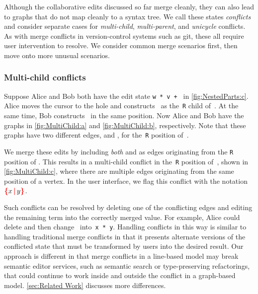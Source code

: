 Although the collaborative edits discussed so far merge cleanly,
they can also lead to graphs that do not map cleanly to a syntax tree.
We call these states \emph{conflicts}
and consider separate cases for \emph{multi-child}, \emph{multi-parent}, and \emph{unicycle} conflicts.
As with merge conflicts in version-control systems such as git, these all require user intervention to resolve.
We consider common merge scenarios first, then move onto more unusual scenarios.
 
\subsubsection{Multi-child conflicts}%
\label{sub:Multi-child conflicts}

\figureMultiChild{}

Suppose Alice and Bob both have the edit state \texttt{w * v + \hole} in \autoref{fig:NestedParts:c}.
Alice moves the cursor to the hole and constructs~\vMultiChildAlice{} as the~\texttt{R} child of~\vWrapPlus{}.
At the same time, Bob constructs~\vMultiChildBob{} in the same position.
Now Alice and Bob have the graphs in \autoref{fig:MultiChild:a} and \autoref{fig:MultiChild:b}, respectively.
Note that these graphs have two different edges,
\eMultiChildAlice{} and \eMultiChildBob{}, for the~\texttt{R} position of~\vWrapPlus{}.

We merge these edits by including \emph{both} \eMultiChildAlice{} and \eMultiChildBob{}
as edges originating from the \texttt{R} position of \vWrapPlus{}.
This results in a multi-child conflict in the~\texttt{R} position of~\vWrapPlus,
shown in \autoref{fig:MultiChild:c},
where there are multiple edges originating from the same position of a vertex.
In the user interface, we flag this conflict with the notation~$\conflictHole{x,y}$.


Such conflicts can be resolved by deleting one of the conflicting edges
and editing the remaining term into the correctly merged value.
For example, Alice could delete \eMultiChildBob{} and then change~\vMultiChildAlice{} into~\texttt{x * y}.
Handling conflicts in this way is similar to handling traditional merge conflicts
in that it presents alternate versions of the conflicted state
that must be transformed by users into the desired result.
Our approach is different in that merge conflicts in a line-based model
may break semantic editor services, such as semantic search or type-preserving refactorings,
that could continue to work inside and outside the conflict in a graph-based model.
\autoref{sec:Related Work} discusses more differences.


